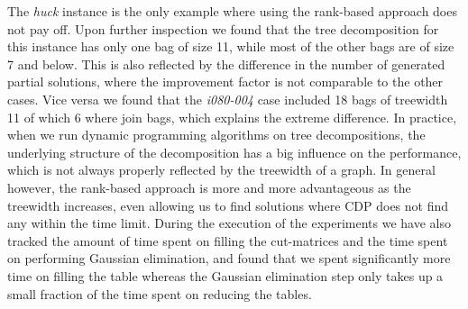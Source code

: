 \documentclass{llncs}
\begin{document}
The \emph{huck} instance is the only example where using the rank-based approach does not pay off.
Upon further inspection we found that the tree decomposition for this instance has only one bag of size 11, while most of the other bags are of size 7 and below. This is also reflected by the difference in the number
of generated partial solutions, where the improvement factor is not comparable to the other cases. Vice versa we found that the \emph{i080-004} case included 18 bags of treewidth 11 of which 6 where join bags, which explains the extreme difference. In practice, when we run dynamic programming algorithms on tree decompositions, the underlying structure of the decomposition has a big influence on the performance, which is not always properly reflected by the treewidth of a graph. In general however, the rank-based approach is more and more advantageous as the
treewidth increases, even allowing us to find solutions where CDP does not
find any within the time limit. During the execution of the experiments we have also tracked the amount of time spent on filling the cut-matrices and the time spent on performing Gaussian elimination, and found that we spent significantly more time on filling the table whereas the Gaussian elimination step only takes up a small fraction of the time spent on reducing the tables.

\begin{table}[!h]
\caption{The maximum number of partial solutions found in bags of a fixed size during the execution of the three algorithms for the \emph{es500fst05} instance}
\label{t3}
\end{table}
\end{document}

